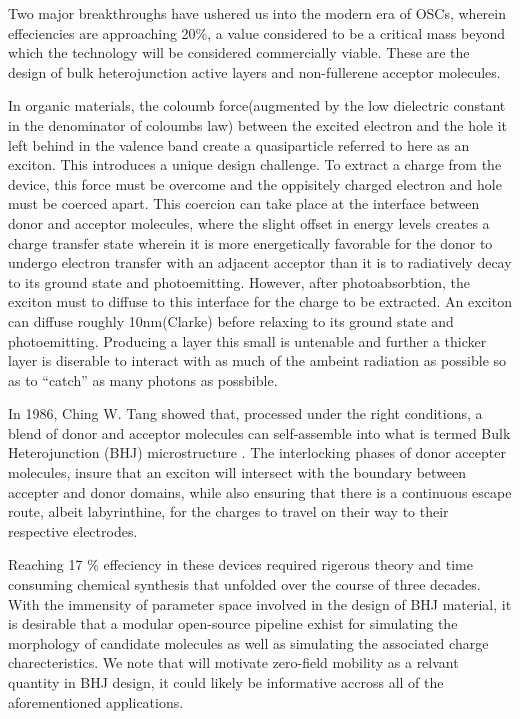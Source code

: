 Two major breakthroughs have ushered us into the modern era of OSCs, wherein effeciencies are approaching 20\%,
a value considered to be a critical mass beyond which the technology will be considered commercially viable.
These are the design of bulk heterojunction active layers and non-fullerene acceptor molecules. 

In organic materials, the coloumb force(augmented by the low dielectric constant in the denominator of coloumbs law) between the excited
electron and the hole it left behind in the valence band create a quasiparticle referred to here as an exciton. 
This introduces a unique design challenge. 
To extract a charge from the device, this force must be overcome and the oppisitely charged electron and hole 
must be coerced apart. This coercion can take place at the interface between donor and acceptor molecules,
where the slight offset in energy levels creates a charge transfer state wherein it is more
energetically favorable for the donor to undergo electron transfer with an adjacent acceptor than
it is to radiatively decay to its ground state and photoemitting.
However, after photoabsorbtion, the exciton must to diffuse to this interface for the charge to be
extracted. An exciton can diffuse roughly 10nm(Clarke) before relaxing
to its ground state and photoemitting. Producing a layer this small is untenable and further a thicker layer
is diserable to interact with as much of the ambeint radiation as possible so as to ``catch'' as many photons
as possbible. 

In 1986, Ching W. Tang
showed that, processed under the right conditions, a blend of donor and acceptor molecules can self-assemble
into what is termed Bulk Heterojunction (BHJ) microstructure \cite{Tang1986c}. 
The interlocking phases of donor accepter molecules, insure
that an exciton will intersect with the boundary between accepter and donor domains, while also ensuring that
there
is a continuous escape route, albeit labyrinthine, for the charges to travel on their way to their respective electrodes. 

Reaching 17 \% effeciency in these devices required rigerous theory and time consuming chemical synthesis
that unfolded over the course of three decades. 
With the immensity of parameter space involved in the design of BHJ material, it is desirable that a modular
open-source pipeline exhist for simulating the morphology of candidate molecules as well as simulating the 
associated charge charecteristics. We note that will motivate zero-field mobility as a relvant quantity in BHJ
design, it could likely be informative accross all of the aforementioned applications. 


